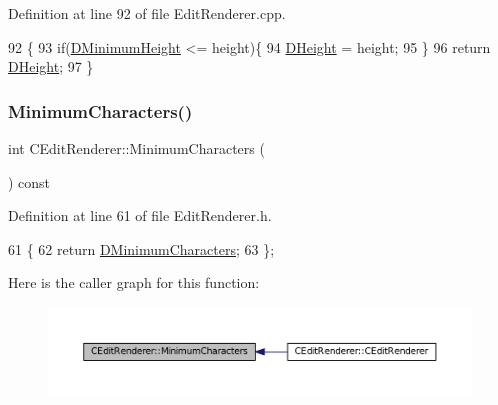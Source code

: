 Definition at line 92 of file Edit\+Renderer.\+cpp.


\begin{DoxyCode}
92                                    \{
93     \textcolor{keywordflow}{if}(\hyperlink{classCEditRenderer_a9e063123747e147ef1c35bd962205fbd}{DMinimumHeight} <= height)\{
94         \hyperlink{classCEditRenderer_ade8dedb4f9790d28b38da8ef20a171cb}{DHeight} = height;   
95     \}
96     \textcolor{keywordflow}{return} \hyperlink{classCEditRenderer_ade8dedb4f9790d28b38da8ef20a171cb}{DHeight};
97 \}
\end{DoxyCode}
\hypertarget{classCEditRenderer_a36726cc31fedec0820076c03186158e7}{}\label{classCEditRenderer_a36726cc31fedec0820076c03186158e7} 
\subsubsection{\texorpdfstring{Minimum\+Characters()}{MinimumCharacters()}\hspace{0.1cm}{\footnotesize\ttfamily [1/2]}}
{\footnotesize\ttfamily int C\+Edit\+Renderer\+::\+Minimum\+Characters (\begin{DoxyParamCaption}{ }\end{DoxyParamCaption}) const\hspace{0.3cm}{\ttfamily [inline]}}



Definition at line 61 of file Edit\+Renderer.\+h.


\begin{DoxyCode}
61                                      \{
62             \textcolor{keywordflow}{return} \hyperlink{classCEditRenderer_ae5d0bd249b2d483c361b0bf9c16c15d3}{DMinimumCharacters};  
63         \};
\end{DoxyCode}
Here is the caller graph for this function\+:
\nopagebreak
\begin{figure}[H]
\begin{center}
\leavevmode
\includegraphics[width=350pt]{classCEditRenderer_a36726cc31fedec0820076c03186158e7_icgraph}
\end{center}
\end{figure}
\hypertarget{classCEditRenderer_a0ed256b9ca7726b2f7de88b4682ed595}{}\label{classCEditRenderer_a0ed256b9ca7726b2f7de88b4682ed595} 
